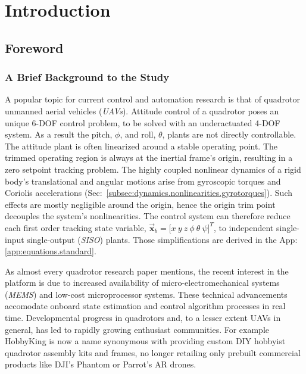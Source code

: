 \chapter{Introduction}
\label{ch:intro}
\section{Foreword}
\label{sec:intro.foreword}
\subsection{A Brief Background to the Study}
\label{subsec:intro.foreword.background}
A popular topic for current control and automation research is that of quadrotor unmanned aerial vehicles (\emph{UAVs}). Attitude control of a quadrotor poses an unique 6-DOF control problem, to be solved with an underactuated 4-DOF system. As a result the pitch, $\phi$, and roll, $\theta$, plants are not directly controllable. The attitude plant is often linearized around a stable operating point. The trimmed operating region is always at the inertial frame's origin, resulting in a zero setpoint tracking problem. The highly coupled nonlinear dynamics of a rigid body's translational and angular motions arise from gyroscopic torques and Coriolis accelerations (Sec:~\ref{subsec:dynamics.nonlinearities.gyrotorques}). Such effects are mostly negligible around the origin, hence the origin trim point decouples the system's nonlinearities. The control system can therefore reduce each first order tracking state variable, $\vec{\mathbf{x}}_b=\big[x~y~z~\phi~\theta~\psi\big]^T$, to independent single-input single-output (\emph{SISO}) plants. Those simplifications are derived in the App:\ref{app:equations.standard}.
\par
As almost every quadrotor research paper mentions, the recent interest in the platform is due to increased availability of micro-electromechanical systems (\emph{MEMS}) and low-cost microprocessor systems. These technical advancements accomodate onboard state estimation and control algorithm processes in real time. Developmental progress in quadrotors and, to a lesser extent UAVs in general, has led to rapidly growing enthusiast communities. For example HobbyKing\cite{hobbyking} is now a name synonymous with providing custom DIY hobbyist quadrotor assembly kits and frames, no longer retailing only prebuilt commercial products like DJI's Phantom\cite{phantom} or Parrot's AR\cite{parrotar} drones.
